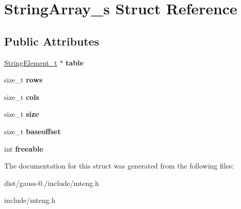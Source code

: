 \hypertarget{struct_string_array__s}{\section{String\-Array\-\_\-s Struct Reference}
\label{struct_string_array__s}
}
\subsection*{Public Attributes}
\begin{DoxyCompactItemize}
\item 
\hypertarget{struct_string_array__s_adffc0e350e9b420f670b320becd58133}{\hyperlink{struct_string_element__s}{String\-Element\-\_\-t} $\ast$ {\bfseries table}}\label{struct_string_array__s_adffc0e350e9b420f670b320becd58133}

\item 
\hypertarget{struct_string_array__s_acb5ce4d377eebbc120fdc8a02e0d1c30}{size\-\_\-t {\bfseries rows}}\label{struct_string_array__s_acb5ce4d377eebbc120fdc8a02e0d1c30}

\item 
\hypertarget{struct_string_array__s_a0412ae11a4f0b1e3dd10810b52eaab01}{size\-\_\-t {\bfseries cols}}\label{struct_string_array__s_a0412ae11a4f0b1e3dd10810b52eaab01}

\item 
\hypertarget{struct_string_array__s_a56f988b234202673e39092707d138f41}{size\-\_\-t {\bfseries size}}\label{struct_string_array__s_a56f988b234202673e39092707d138f41}

\item 
\hypertarget{struct_string_array__s_ae1a77586f9dafbace589222b16dfc9ae}{size\-\_\-t {\bfseries baseoffset}}\label{struct_string_array__s_ae1a77586f9dafbace589222b16dfc9ae}

\item 
\hypertarget{struct_string_array__s_a61b2dc2a8f586256d9fb4d6ee65be321}{int {\bfseries freeable}}\label{struct_string_array__s_a61b2dc2a8f586256d9fb4d6ee65be321}

\end{DoxyCompactItemize}


The documentation for this struct was generated from the following files\-:\begin{DoxyCompactItemize}
\item 
dist/gauss-\/0./include/mteng.\-h\item 
include/mteng.\-h\end{DoxyCompactItemize}
